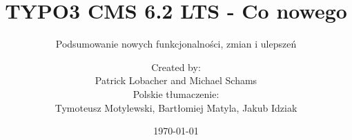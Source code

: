%
%
%

\documentclass[t]{beamer}

\beamertemplatenavigationsymbolsempty

\usepackage[utf8]{inputenc}

{
	\usetheme{typo3slides}
}

\title{TYPO3 CMS 6.2 LTS - Co nowego   }
\subtitle{Podsumowanie nowych funkcjonalności, zmian i ulepszeń}
\author{
	\centerline{Created by:}
	\centerline{Patrick Lobacher and Michael Schams}
	\vspace{0.2cm}
	\centerline{Polskie tłumaczenie:}
	\centerline{Tymoteusz Motylewski, Bartłomiej Matyla, Jakub Idziak}
}
\date{\today}



\sharefont


\begingroup
	[default]
	\begin{frame}
		\titlepage
	\end{frame}
\endgroup



